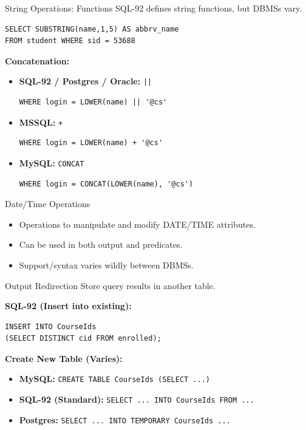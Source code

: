 \documentclass[aspectratio=169]{beamer}
\begin{document}
\begin{frame}[fragile]{String Operations: Functions}
    SQL-92 defines string functions, but DBMSs vary.
    
    \begin{lstlisting}
SELECT SUBSTRING(name,1,5) AS abbrv_name
FROM student WHERE sid = 53688
    \end{lstlisting}
    
    \textbf{Concatenation:}
    \begin{itemize}
        \item \textbf{SQL-92 / Postgres / Oracle:} \texttt{||} 
        \begin{lstlisting}
WHERE login = LOWER(name) || '@cs'
        \end{lstlisting}
        \item \textbf{MSSQL:} \texttt{+}
        \begin{lstlisting}
WHERE login = LOWER(name) + '@cs'
        \end{lstlisting}
        \item \textbf{MySQL:} \texttt{CONCAT}
        \begin{lstlisting}
WHERE login = CONCAT(LOWER(name), '@cs')
        \end{lstlisting}
    \end{itemize}
\end{frame}

\begin{frame}{Date/Time Operations}
    \begin{itemize}
        \item Operations to manipulate and modify DATE/TIME attributes.
        \item Can be used in both output and predicates.
        \item Support/syntax varies wildly between DBMSs.
    \end{itemize}
\end{frame}

\begin{frame}[fragile]{Output Redirection}
    Store query results in another table.
    
    \textbf{SQL-92 (Insert into existing):}
    \begin{lstlisting}
INSERT INTO CourseIds
(SELECT DISTINCT cid FROM enrolled);
    \end{lstlisting}
    
    \textbf{Create New Table (Varies):}
    \begin{itemize}
        \item \textbf{MySQL:} \texttt{CREATE TABLE CourseIds (SELECT ...)}
        \item \textbf{SQL-92 (Standard):} \texttt{SELECT ... INTO CourseIds FROM ...}
        \item \textbf{Postgres:} \texttt{SELECT ... INTO TEMPORARY CourseIds ...}
    \end{itemize}
\end{frame}
\end{document}
